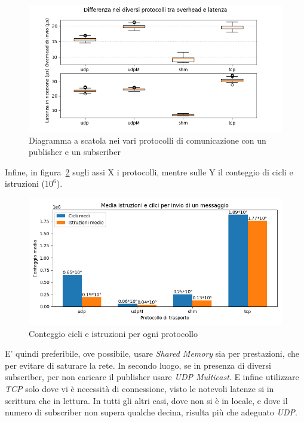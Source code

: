 \begin{figure}[H]
    \includegraphics[width=\textwidth]{./results/test1_box_sr_1p1s.png} 
        \caption{Diagramma a scatola nei vari protocolli di comunicazione con un publisher e un subscriber}\label{fig:test1sdbox}
\end{figure}
Infine, in figura~\ref{fig:test3_cycle_different_protocols} sugli assi X i protocolli, mentre sulle Y il conteggio di cicli e istruzioni ($10^6$).
\begin{figure}[H]
    \includegraphics[width=\textwidth]{./results/test1_cyclinstr.png} 
        \caption{Conteggio cicli e istruzioni per ogni protocollo}\label{fig:test3_cycle_different_protocols}
\end{figure}
E' quindi preferibile, ove possibile, usare \emph{Shared Memory} sia per prestazioni, che per evitare di saturare la rete. In secondo luogo, se in presenza di diversi subscriber, per non caricare il publisher usare \emph{UDP Multicast}. E infine utilizzare \emph{TCP} solo dove vi è necessità di connessione, visto le notevoli latenze si in scrittura che in lettura. In tutti gli altri casi, dove non si è in locale, e dove il numero di subscriber non supera qualche decina, risulta più che adeguato \emph{UDP}.

